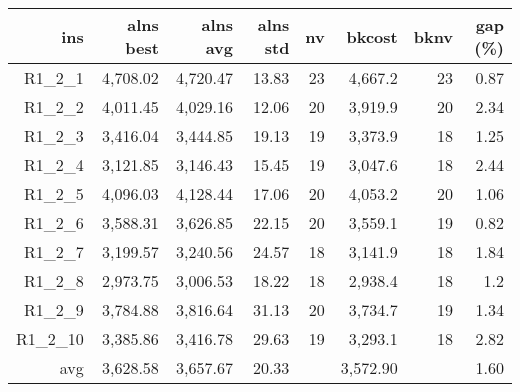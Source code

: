   \begin{table}[caption={Kết quả đo với tập HG\_R\_1\_2 200 yêu cầu}, label=exp:HGR12]
      \small
      \centering
      \begin{tabular}{rrrrrrrr}
        \hline
        ins & alns best & alns avg & alns std & nv & bkcost & bknv & gap (\%) \\ \hline
        R1\_2\_1 & 4,708.02 & 4,720.47 & 13.83 & 23 & 4,667.2 & 23 & 0.87 \\ \hline
        R1\_2\_2 & 4,011.45 & 4,029.16 & 12.06 & 20 & 3,919.9 & 20 & 2.34 \\ \hline
        R1\_2\_3 & 3,416.04 & 3,444.85 & 19.13 & 19 & 3,373.9 & 18 & 1.25 \\ \hline
        R1\_2\_4 & 3,121.85 & 3,146.43 & 15.45 & 19 & 3,047.6 & 18 & 2.44 \\ \hline
        R1\_2\_5 & 4,096.03 & 4,128.44 & 17.06 & 20 & 4,053.2 & 20 & 1.06 \\ \hline
        R1\_2\_6 & 3,588.31 & 3,626.85 & 22.15 & 20 & 3,559.1 & 19 & 0.82 \\ \hline
        R1\_2\_7 & 3,199.57 & 3,240.56 & 24.57 & 18 & 3,141.9 & 18 & 1.84 \\ \hline
        R1\_2\_8 & 2,973.75 & 3,006.53 & 18.22 & 18 & 2,938.4 & 18 & 1.2 \\ \hline
        R1\_2\_9 & 3,784.88 & 3,816.64 & 31.13 & 20 & 3,734.7 & 19 & 1.34 \\ \hline
        R1\_2\_10 & 3,385.86 & 3,416.78 & 29.63 & 19 & 3,293.1 & 18 & 2.82 \\ \hline
        avg & 3,628.58 & 3,657.67 & 20.33 & & 3,572.90 & & 1.60 \\ \hline
      \end{tabular}
  \end{table}
      
